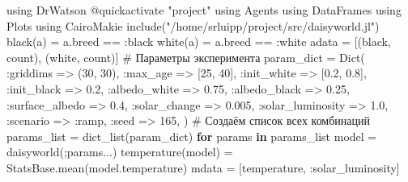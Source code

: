 \documentclass[
  english,
  russian,
  12pt,
  a4paper,
  DIV=11,
  numbers=noendperiod]{scrreprt}
\newenvironment{Shaded}{\begin{snugshade}}{\end{snugshade}}
\newcommand{\BuiltInTok}[1]{\textcolor[rgb]{0.00,0.23,0.31}{#1}}
\newcommand{\CommentTok}[1]{\textcolor[rgb]{0.37,0.37,0.37}{#1}}
\newcommand{\ControlFlowTok}[1]{\textcolor[rgb]{0.00,0.23,0.31}{\textbf{#1}}}
\newcommand{\FloatTok}[1]{\textcolor[rgb]{0.68,0.00,0.00}{#1}}
\newcommand{\FunctionTok}[1]{\textcolor[rgb]{0.28,0.35,0.67}{#1}}
\newcommand{\ImportTok}[1]{\textcolor[rgb]{0.00,0.46,0.62}{#1}}
\newcommand{\KeywordTok}[1]{\textcolor[rgb]{0.00,0.23,0.31}{\textbf{#1}}}
\newcommand{\NormalTok}[1]{\textcolor[rgb]{0.00,0.23,0.31}{#1}}
\newcommand{\OperatorTok}[1]{\textcolor[rgb]{0.37,0.37,0.37}{#1}}
\newcommand{\PreprocessorTok}[1]{\textcolor[rgb]{0.68,0.00,0.00}{#1}}
\newcommand{\StringTok}[1]{\textcolor[rgb]{0.13,0.47,0.30}{#1}}
\begin{document}
\begin{Shaded}
\begin{Highlighting}[]
\ImportTok{using} \BuiltInTok{DrWatson}
\PreprocessorTok{@quickactivate} \StringTok{"project"}
\ImportTok{using} \BuiltInTok{Agents}
\ImportTok{using} \BuiltInTok{DataFrames}
\ImportTok{using} \BuiltInTok{Plots}
\ImportTok{using} \BuiltInTok{CairoMakie}
\FunctionTok{include}\NormalTok{(}\StringTok{"/home/srluipp/project/src/daisyworld.jl"}\NormalTok{)}
\FunctionTok{black}\NormalTok{(a) }\OperatorTok{=}\NormalTok{ a.breed }\OperatorTok{==} \OperatorTok{:}\NormalTok{black}
\FunctionTok{white}\NormalTok{(a) }\OperatorTok{=}\NormalTok{ a.breed }\OperatorTok{==} \OperatorTok{:}\NormalTok{white}
\NormalTok{adata }\OperatorTok{=}\NormalTok{ [(black, count), (white, count)]}
\CommentTok{\# Параметры эксперимента}
\NormalTok{param\_dict }\OperatorTok{=} \FunctionTok{Dict}\NormalTok{(}
\OperatorTok{:}\NormalTok{griddims }\OperatorTok{=\textgreater{}}\NormalTok{ (}\FloatTok{30}\NormalTok{, }\FloatTok{30}\NormalTok{),}
\OperatorTok{:}\NormalTok{max\_age }\OperatorTok{=\textgreater{}}\NormalTok{ [}\FloatTok{25}\NormalTok{, }\FloatTok{40}\NormalTok{],}
\OperatorTok{:}\NormalTok{init\_white }\OperatorTok{=\textgreater{}}\NormalTok{ [}\FloatTok{0.2}\NormalTok{, }\FloatTok{0.8}\NormalTok{],}
\OperatorTok{:}\NormalTok{init\_black }\OperatorTok{=\textgreater{}} \FloatTok{0.2}\NormalTok{,}
\OperatorTok{:}\NormalTok{albedo\_white }\OperatorTok{=\textgreater{}} \FloatTok{0.75}\NormalTok{,}
\OperatorTok{:}\NormalTok{albedo\_black }\OperatorTok{=\textgreater{}} \FloatTok{0.25}\NormalTok{,}
\OperatorTok{:}\NormalTok{surface\_albedo }\OperatorTok{=\textgreater{}} \FloatTok{0.4}\NormalTok{,}
\OperatorTok{:}\NormalTok{solar\_change }\OperatorTok{=\textgreater{}} \FloatTok{0.005}\NormalTok{,}
\OperatorTok{:}\NormalTok{solar\_luminosity }\OperatorTok{=\textgreater{}} \FloatTok{1.0}\NormalTok{,}
\OperatorTok{:}\NormalTok{scenario }\OperatorTok{=\textgreater{}} \OperatorTok{:}\NormalTok{ramp,}
\OperatorTok{:}\NormalTok{seed }\OperatorTok{=\textgreater{}} \FloatTok{165}\NormalTok{,}
\NormalTok{)}
\CommentTok{\# Создаём список всех комбинаций}
\NormalTok{params\_list }\OperatorTok{=} \FunctionTok{dict\_list}\NormalTok{(param\_dict)}
\ControlFlowTok{for}\NormalTok{ params }\KeywordTok{in}\NormalTok{ params\_list}
\NormalTok{model }\OperatorTok{=} \FunctionTok{daisyworld}\NormalTok{(;params}\OperatorTok{...}\NormalTok{)}
\FunctionTok{temperature}\NormalTok{(model) }\OperatorTok{=}\NormalTok{ StatsBase.}\FunctionTok{mean}\NormalTok{(model.temperature)}
\NormalTok{mdata }\OperatorTok{=}\NormalTok{ [temperature, }\OperatorTok{:}\NormalTok{solar\_luminosity]}

\end{Highlighting}
\end{Shaded}
\end{document}
